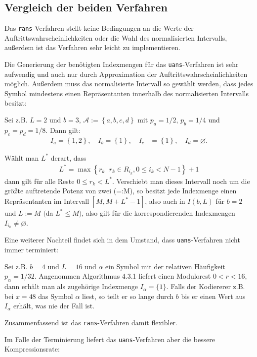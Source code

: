 \documentclass[a4paper,12pt]{article}
\newcommand{\A}{\mathcal A}
\newcounter{Algorithmus}
\begin{document}
\subsection{Vergleich der beiden Verfahren}\label{vglBeiderVerfahren}
Das {\tt{rans}}-Verfahren stellt keine Bedingungen an die Werte der Auftrittswahrscheinlichkeiten oder die Wahl des normalisierten Intervalls, außerdem ist das Verfahren sehr leicht zu implementieren.
\par
Die Generierung der benötigten Indexmengen für das {\tt{uans}}-Verfahren ist sehr aufwendig und auch nur durch Approximation der Auftrittswahrscheinlichkeiten möglich. Außerdem
muss das normalisierte Intervall so gewählt werden, dass jedes Symbol mindestens einen Repräsentanten innerhalb  des normalisierten Intervalls besitzt:
\par
Sei z.B. $L=2$ und $b=3$, $\A:=\left\{a, b, c, d\right\}$ mit $p_{a}=1/2$, $p_{b}=1/4$ und $p_{c}=p_{d}=1/8$. 
Dann gilt:
\begin{align*}
I_{a}=\left\{1,2\right\},\quad  I_{b}=\left\{1\right\},\quad I_{c}&=\left\{1\right\},\quad I_{d}=\varnothing.
\end{align*}
\par
Wählt man $L^{*}$ derart, dass 
\begin{align*}
L^{*} = \max \left\{r_{k}\,|\,r_{k}\in R_{i_{k}}, 0\leq i_{k} < N-1\right\} +1
\end{align*} 
dann gilt für alle Reste $0 \leq r_{k} < L^{*}$. Verschiebt man dieses Intervall noch um die größte auftretende Potenz von zwei (=:M), so besitzt jede Indexmenge einen Repräsentanten im Intervall $[M,M + L^{*}-1]$, also auch in $I(b,L)$ für $b=2$ und $L:=M$ $($da $L^{*} \leq M)$, also gilt für die korrespondierenden Indexmengen $I_{i_{k}} \neq \varnothing$.
\par
Eine weiterer Nachteil findet sich in dem Umstand, dass {\tt{uans}}-Verfahren nicht immer terminiert:
\par
Sei z.B. $b=4$ und $L=16$ und $\alpha$ ein Symbol mit der relativen Häufigkeit $p_{\alpha}=1/32$. Angenommen Algorithmus 4.3.1 liefert einen Modulorest $0 < r < 16$, dann erhält man als zugehörige Indexmenge $I_{\alpha}=\{1\}$. Falls der Kodiererer z.B. bei  $x=48$ das Symbol $\alpha$ liest, so teilt er so lange durch $b$ bis er einen Wert aus $I_{\alpha}$ erhält, was nie der Fall ist.
\par
Zusammenfassend ist das {\tt{rans}}-Verfahren damit flexibler. 
\par
Im Falle der Terminierung liefert das {\tt{uans}}-Verfahren  aber die bessere Kompressionsrate:
\end{document}
